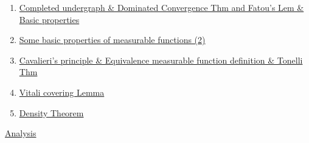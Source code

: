 \documentclass[11pt]{article}
\begin{document}
\begin{enumerate}
	\item 	\href{https://mp.weixin.qq.com/s/ZBjjosmm-aI13SFK3FD4dw}{Completed undergraph \& Dominated Convergence Thm and Fatou’s Lem \& Basic properties}	%
	\item 	\href{https://mp.weixin.qq.com/s/Bt4O4E_81nVkne1RfZ3FAA}{Some basic properties of measurable functions (2)}	%
	\item 	\href{https://mp.weixin.qq.com/s/OdtftvtTqB4Ix0UIsViFng}{Cavalieri's principle \& Equivalence measurable function definition \& Tonelli Thm}	%
	\item 	\href{https://mp.weixin.qq.com/s/hHAyKkd_I6ffiJXtQfVqGA}{Vitali covering Lemma}	%
	\item 	\href{https://mp.weixin.qq.com/s/RBM3zLLEe9C4Jrct7W5sOg}{Density Theorem}	%
\end{enumerate}

\newpage 

\begin{center}
	\large {\href{https://www.youtube.com/playlist?list=PLVJXJebpO4PhfoJl9LEuiI30P1JxvLEga}{Analysis }} 
\end{center}

\vspace{-0.5cm}
\end{document}
